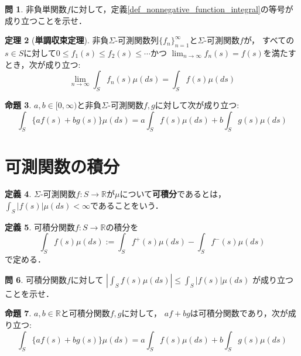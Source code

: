 \documentclass{jsreport}
\theoremstyle{definition}
\newtheorem{defi}{定義}[section]
\newtheorem{prop}[defi]{命題}
\newtheorem{thm}[defi]{定理}
\newtheorem{qst}[defi]{問}
\begin{document}
\begin{qst}\label{qst_nonnegative_function_integral_and_simple_function}
非負単関数$f$に対して，定義\ref{def_nonnegative_function_integral}の等号が成り立つことを示せ．
\end{qst}

\begin{thm}[\textbf{単調収束定理}]\label{monotone_convergence_theorem}
非負$\Sigma$-可測関数列$\{f_n\}_{n=1}^\infty$と$\Sigma$-可測関数$f$が，
すべての$s \in S$に対して$0 \leq f_1(s) \leq f_2(s) \leq\cdots$かつ
$\displaystyle\lim_{n\to\infty}f_n(s)=f(s)$を満たすとき，次が成り立つ:
\[ \lim_{n\to\infty}\int_S f_n(s)\mu(ds)=\int_S f(s)\mu(ds) \]
\end{thm}

\begin{prop}\label{prop_linearity_of_nonnegative_function_integral}
$a,b\in[0,\infty)$と非負$\Sigma$-可測関数$f,g$に対して次が成り立つ:
\[ \int_S\{af(s)+bg(s)\}\mu(ds)=a\int_Sf(s)\mu(ds)+b\int_Sg(s)\mu(ds) \]
\end{prop}

\section{可測関数の積分}

\begin{defi}\label{def_integrable_function}
$\Sigma$-可測関数$f \colon S\to\mathbb{R}$が$\mu$について\textbf{可積分}であるとは，
$\displaystyle\int_S|f(s)|\mu(ds)<\infty$であることをいう．

\end{defi}

\begin{defi}\label{def_measurable_function_integral}
可積分関数$f \colon S\to\mathbb{R}$の積分を
\[ \int_S f(s)\mu(ds):=\int_S f^+(s)\mu(ds)-\int_S f^-(s)\mu(ds)  \]
で定める．
\end{defi}

\begin{qst}\label{qst_absolute_integral_and_integral_absolute}
可積分関数$f$に対して
$\displaystyle\left|\int_Sf(s)\mu(ds)\right|\leq\int_S|f(s)|\mu(ds)$
が成り立つことを示せ．
\end{qst}

\begin{prop}\label{prop_linearity_of_integrable_function_integral}
$a,b\in\mathbb{R}$と可積分関数$f,g$に対して，
$af+bg$は可積分関数であり，次が成り立つ:
\[ \int_S\{af(s)+bg(s)\}\mu(ds)=a\int_Sf(s)\mu(ds)+b\int_Sg(s)\mu(ds) \]
\end{prop}
\end{document}
